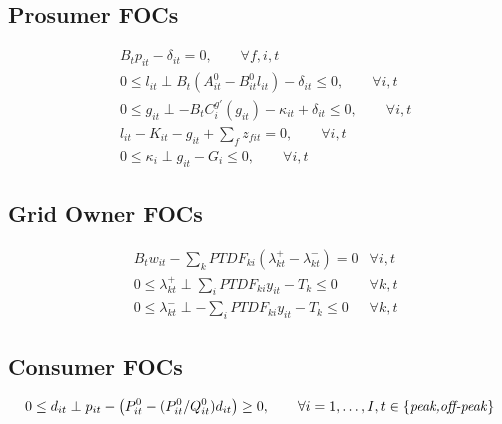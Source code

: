 \documentclass[12pt,onecolumn]{IEEEtran}
\theoremstyle{plain}
\theoremstyle{definition}
\begin{document}
\subsection{Prosumer FOCs}

\begin{subequations}
\label{e8}
\begin{align}
& B_t p_{it} - \delta_{it} = 0, \qquad \forall f,i,t	\label{8a}\\
& 0 \leq l_{it} \perp B_t(A^0_{it} - B^0_{it} l_{it}) - \delta_{it}  \leq 0, \qquad \forall i,t  \label{8b}  \\
& 0 \leq g_{it}  \perp - B_t C^{g\prime}_i(g_{it}) -\kappa_{it} + \delta_{it}  \leq 0, \qquad \forall i,t \label{8c}\\
& l_{it} - K_{it} - g_{it} + \sum_f z_{fit}= 0, \qquad \forall i,t \\
& 0 \leq \kappa_i  \perp  g_{it} - G_i \leq 0, \qquad \forall i,t \label{8d}
\end{align}
\end{subequations}

\subsection{Grid Owner FOCs}
\begin{subequations}\label{e10}
\begin{align}
& B_t w_{it} - \sum_{k} PTDF_{ki}(\lambda_{kt}^+ - \lambda_{kt}^-) = 0 & \forall i,t \\
&0 \leq \lambda_{kt}^+ \perp \sum_i PTDF_{ki}y_{it} - T_{k} \leq 0 &  \forall k,t \\
&0 \leq \lambda_{kt}^- \perp -\sum_i PTDF_{ki}y_{it} - T_{k} \leq 0 & \forall k,t
\end{align}
\end{subequations}


\subsection{Consumer FOCs}
\begin{align}
0 \leq d_{it} \perp p_{it} -\big(P^0_{it} - ({P^0_{it}}/{Q^0_{it}})d_{it}\big) \geq 0 , \qquad \forall i = 1, \ldots, I, t \in \{\text{\textit{peak,off-peak}}\} \label{demand}
\end{align}
\end{document}
